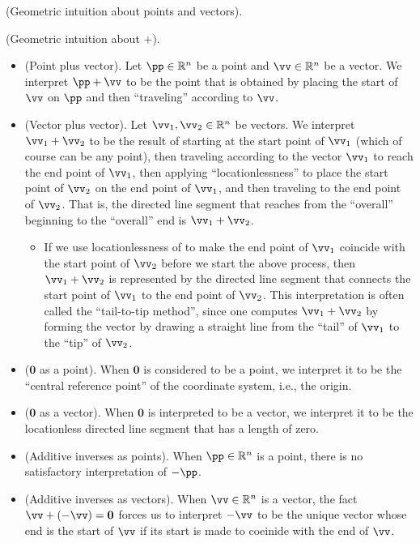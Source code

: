 \begin{remark}
    (Geometric intuition about points and vectors).
        
    (Geometric intuition about $+$).
    \begin{itemize}
        \item (Point plus vector). Let $\pp \in \R^n$ be a point and $\vv \in \R^n$ be a vector. We interpret $\pp + \vv$ to be the point that is obtained by placing the start of $\vv$ on $\pp$ and then ``traveling'' according to $\vv$.
        \item (Vector plus vector). Let $\vv_1, \vv_2 \in \R^n$ be vectors. We interpret $\vv_1 + \vv_2$ to be the result of starting at the start point of $\vv_1$ (which of course can be any point), then traveling according to the vector $\vv_1$ to reach the end point of $\vv_1$, then applying ``locationlessness'' to place the start point of $\vv_2$ on the end point of $\vv_1$, and then traveling to the end point of $\vv_2$. That is, the directed line segment that reaches from the ``overall'' beginning to the ``overall'' end is $\vv_1 + \vv_2$.
        \begin{itemize}
            \item If we use locationlessness of to make the end point of $\vv_1$ coincide with the start point of $\vv_2$ before we start the above process, then $\vv_1 + \vv_2$ is represented by the directed line segment that connects the start point of $\vv_1$ to the end point of $\vv_2$. This interpretation is often called the ``tail-to-tip method'', since one computes $\vv_1 + \vv_2$ by forming the vector by drawing a straight line from the “tail” of $\vv_1$ to the “tip” of $\vv_2$.
        \end{itemize}
        \item ($\mathbf{0}$ as a point). When $\mathbf{0}$ is considered to be a point, we interpret it to be the ``central reference point'' of the coordinate system, i.e., the origin.
        \item ($\mathbf{0}$ as a vector). When $\mathbf{0}$ is interpreted to be a vector, we interpret it to be the locationless directed line segment that has a length of zero.
        \item (Additive inverses as points). When $\pp \in \R^n$ is a point, there is no satisfactory interpretation of $-\pp$.
        \item (Additive inverses as vectors). When $\vv \in \R^n$ is a vector, the fact $\vv + (-\vv) = \mathbf{0}$ forces us to interpret $-\vv$ to be the unique vector whose end is the start of $\vv$ if its start is made to coeinide with the end of $\vv$.
    \end{itemize}


\end{remark}
